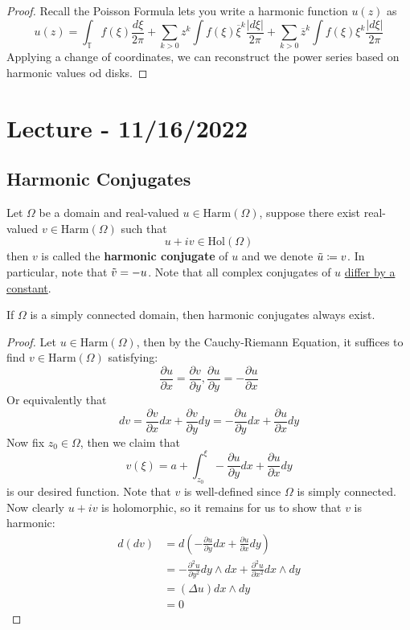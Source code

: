 \documentclass{article}
\begin{document}
\begin{proof}
    Recall the Poisson Formula lets you write a harmonic function $u(z)$ as
    \[u(z) = \int_{\mathbb{T}} f(\xi) \frac{d\xi}{2\pi} + \sum_{k > 0} z^k \int f(\xi) \overline{\xi}^k \frac{|d\xi|}{2\pi} + \sum_{k > 0} \overline{z}^k \int f(\xi) \xi^k \frac{|d\xi|}{2\pi}\]
    Applying a change of coordinates, we can reconstruct the power series based on harmonic values od disks.
\end{proof}

\section{Lecture - 11/16/2022}

\subsection{Harmonic Conjugates}

\begin{definition}
    Let $\Omega$ be a domain and real-valued $u \in \text{Harm}(\Omega)$, suppose there exist real-valued $v \in \text{Harm}(\Omega)$ such that
    \[u + iv \in \text{Hol}(\Omega)\]
    then $v$ is called the \textbf{harmonic conjugate} of $u$ and we denote $\Tilde{u} \coloneqq v$. In particular, note that $\Tilde{v} = -u$. Note that all complex conjugates of $u$ \underline{differ by a constant}.
\end{definition}

\begin{theorem}
    If $\Omega$ is a simply connected domain, then harmonic conjugates always exist.
\end{theorem}

\begin{proof}
    Let $u \in \text{Harm}(\Omega)$, then by the Cauchy-Riemann Equation, it suffices to find $v \in \text{Harm}(\Omega)$ satisfying:
    \[\frac{\partial u}{\partial x} = \frac{\partial v}{\partial y}, \frac{\partial u}{\partial y} = -\frac{\partial u}{\partial x}\]
    Or equivalently that
    \[dv = \frac{\partial v}{\partial x} dx + \frac{\partial v}{\partial y} dy = - \frac{\partial u}{\partial y} dx + \frac{\partial u}{\partial x} dy\]
    Now fix $z_0 \in \Omega$, then we claim that
    \[v(\xi) = a + \int_{z_0}^\xi - \frac{\partial u}{\partial y} dx + \frac{\partial u}{\partial x} dy\]
    is our desired function. Note that $v$ is well-defined since $\Omega$ is simply connected. Now clearly $u + iv$ is holomorphic, so it remains for us to show that $v$ is harmonic:
    \begin{align*}
        d(dv) &= d(- \frac{\partial u}{\partial y} dx + \frac{\partial u}{\partial x} dy)\\
        &= -\frac{\partial^2 u}{\partial y^2} dy \wedge dx + \frac{\partial^2 u}{\partial x^2} dx \wedge dy\\
        &= (\Delta u) dx \wedge dy\\
        &= 0 \tag*{$u$ is harmonic}
    \end{align*}
\end{proof}
\end{document}
